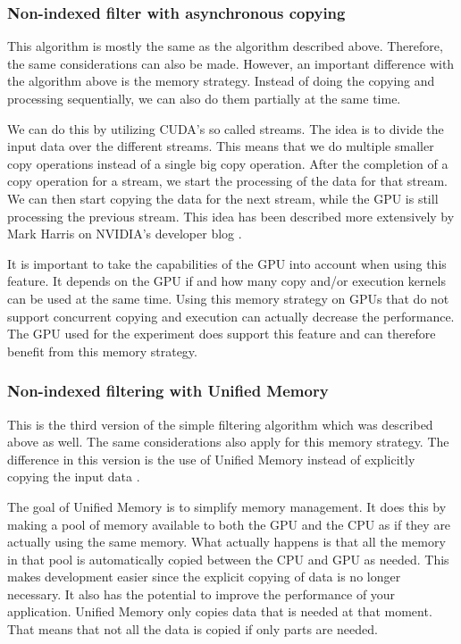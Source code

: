 \documentclass[a4paper,titlepage]{article}
\begin{document}
\subsubsection{Non-indexed filter with asynchronous copying}
\label{sec:filter-asynchronous}
This algorithm is mostly the same as the algorithm described above. Therefore, the same considerations can also be made. However, an important difference with the algorithm above is the memory strategy. Instead of doing the copying and processing sequentially, we can also do them partially at the same time.

We can do this by utilizing CUDA's so called streams. The idea is to divide the input data over the different streams. This means that we do multiple smaller copy operations instead of a single big copy operation. After the completion of a copy operation for a stream, we start the processing of the data for that stream. We can then start copying the data for the next stream, while the GPU is still processing the previous stream. This idea has been described more extensively by Mark Harris on NVIDIA's developer blog \cite{cuda-overlap-streams}.

It is important to take the capabilities of the GPU into account when using this feature. It depends on the GPU if and how many copy and/or execution kernels can be used at the same time. Using this memory strategy on GPUs that do not support concurrent copying and execution can actually decrease the performance. The GPU used for the experiment does support this feature and can therefore benefit from this memory strategy.

\subsubsection{Non-indexed filtering with Unified Memory}
\label{sec:filter-unified-memory}
This is the third version of the simple filtering algorithm which was described above as well. The same considerations also apply for this memory strategy. The difference in this version is the use of Unified Memory instead of explicitly copying the input data \cite{harris2013}.

The goal of Unified Memory is to simplify memory management. It does this by making a pool of memory available to both the GPU and the CPU as if they are actually using the same memory. What actually happens is that all the memory in that pool is automatically copied between the CPU and GPU as needed. This makes development easier since the explicit copying of data is no longer necessary. It also has the potential to improve the performance of your application. Unified Memory only copies data that is needed at that moment. That means that not all the data is copied if only parts are needed.
\end{document}
